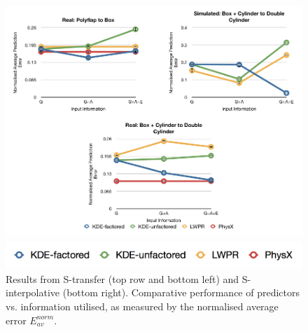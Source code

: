 \begin{figure}[t]
\centerline{\includegraphics[width=0.95\columnwidth]{graphs_jw/S_real_sim_av_graph}
}
\centerline{\includegraphics[width=0.9\columnwidth]{graphs_jw/graph_key}}
\caption{Results from S-transfer (top row and bottom left) and S-interpolative
  (bottom right). Comparative performance of predictors vs. information utilised,
as measured by the normalised average error ${E_{av}^{norm}}$.
}\label{fig:S_av_graphs}
\end{figure}

